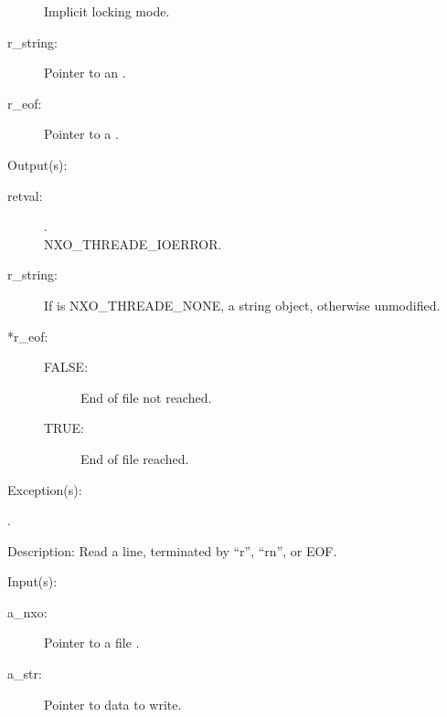 \begin{capi}
\begin{capilist}
\begin{description}
			Implicit locking mode.
		\item[r\_string: ]
			Pointer to an .
		\item[r\_eof: ]
			Pointer to a .
		\end{description}
	\item[Output(s): ]
		\begin{description}\item[]
		\item[retval: ]
			\begin{description}\item[]
			\item[.]
			\item[
				{NXO_THREADE_IOERROR}.]
			\end{description}
		\item[r\_string: ]
			If  is NXO\_THREADE\_NONE, a string object,
			otherwise unmodified.
		\item[*r\_eof: ]
			\begin{description}\item[]
			\item[FALSE: ]
				End of file not reached.
			\item[TRUE: ]
				End of file reached.
			\end{description}
		\end{description}
	\item[Exception(s): ]
		\begin{description}\item[]
		\item[.]
		\end{description}
	\item[Description: ]
		Read a line, terminated by ``{\bs}r'', ``{\bs}r{\bs}n'', or EOF.
	\end{capilist}
\label{nxo_file_write}
	\begin{capilist}
	\item[Input(s): ]
		\begin{description}\item[]
		\item[a\_nxo: ]
			Pointer to a file .
		\item[a\_str: ]
			Pointer to data to write.

\end{description}
\end{capilist}
\end{capi}
